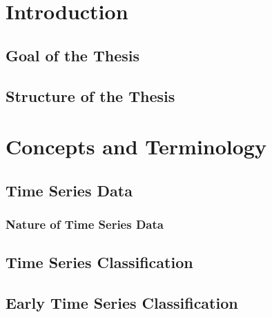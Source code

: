 \renewcommand*\contentsname{Table of Contents}
\tableofcontents
\thispagestyle{empty}
 
 \null\newpage
{} 






\thispagestyle{empty}
\null\newpage
{} 
\section{Introduction}

\subsection{Goal of the Thesis}

\subsection{Structure of the Thesis}


\null\newpage

\section{Concepts and Terminology}

\subsection{Time Series Data}

\subsubsection{Nature of Time Series Data}

\subsection{Time Series Classification}

\subsection{Early Time Series Classification}

